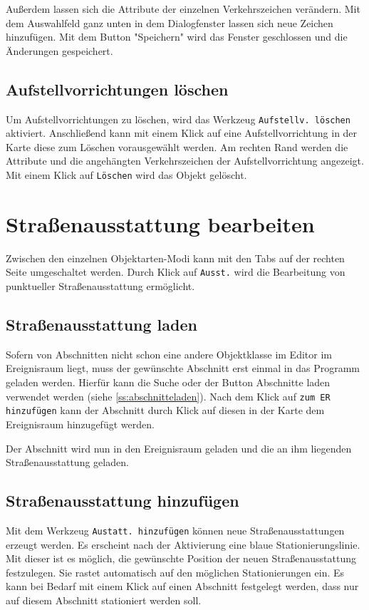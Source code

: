 \documentclass[a4paper,11pt,bibliography=totoc, listof=totoc,titlepage]{scrartcl}
\begin{document}
Außerdem lassen sich die Attribute der einzelnen Verkehrszeichen verändern. Mit dem Auswahlfeld ganz unten in dem Dialogfenster lassen sich neue Zeichen hinzufügen. Mit dem Button "Speichern" wird das Fenster geschlossen und die Änderungen gespeichert.

\subsection{Aufstellvorrichtungen löschen}
Um Aufstellvorrichtungen zu löschen, wird das Werkzeug \verb|Aufstellv. löschen| aktiviert. Anschließend kann mit einem Klick auf eine Aufstellvorrichtung in der Karte diese zum Löschen vorausgewählt werden. Am rechten Rand werden die Attribute und die angehängten Verkehrszeichen der Aufstellvorrichtung angezeigt. Mit einem Klick auf \verb|Löschen| wird das Objekt gelöscht.

\section{Straßenausstattung bearbeiten}
\label{s:straus}
Zwischen den einzelnen Objektarten-Modi kann mit den Tabs auf der rechten Seite umgeschaltet werden. Durch Klick auf \verb|Ausst.| wird die Bearbeitung von punktueller Straßenausstattung ermöglicht.

\subsection{Straßenausstattung laden}
Sofern von Abschnitten nicht schon eine andere Objektklasse im Editor im Ereignisraum liegt, muss der gewünschte Abschnitt erst einmal in das Programm geladen werden. Hierfür kann die Suche oder der Button Abschnitte laden verwendet werden (siehe \autoref{ss:abschnitteladen}). Nach dem Klick auf \verb|zum ER hinzufügen| kann der Abschnitt durch Klick auf diesen in der Karte dem Ereignisraum hinzugefügt werden.

Der Abschnitt wird nun in den Ereignisraum geladen und die an ihm liegenden Straßenausstattung geladen.

\subsection{Straßenausstattung hinzufügen}
Mit dem Werkzeug \verb|Austatt. hinzufügen| können neue Straßenausstattungen erzeugt werden. Es erscheint nach der Aktivierung eine blaue Stationierungslinie. Mit dieser ist es möglich, die gewünschte Position der neuen Straßenausstattung festzulegen. Sie rastet automatisch auf den möglichen Stationierungen ein. Es kann bei Bedarf mit einem Klick auf einen Abschnitt festgelegt werden, dass nur auf diesem Abschnitt stationiert werden soll.
\end{document}
